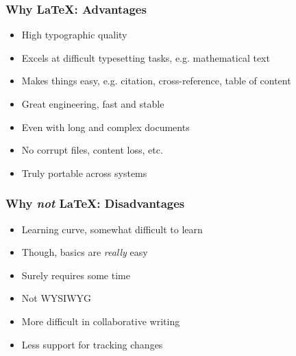 \documentclass{beamer}
\begin{document}



\begin{frame}
  \frametitle{Why \LaTeX: Advantages}
  
  \begin{itemize}
    \item High typographic quality
    \item Excels at difficult typesetting tasks, e.g. mathematical text
    \item Makes things easy, e.g. citation, cross-reference, table of content
    \item Great engineering, fast and stable
    \item Even with long and complex documents
    \item No corrupt files, content loss, etc.
    \item Truly portable across systems
  \end{itemize}
\end{frame}

\begin{frame}
  \frametitle{Why \emph{not} \LaTeX: Disadvantages}
	
  \begin{itemize}
    \item Learning curve, somewhat difficult to learn
    \item Though, basics are \emph{really} easy
    \item Surely requires some time
    \item Not WYSIWYG
    \item More difficult in collaborative writing
    \item Less support for tracking changes
  \end{itemize}
\end{frame}
\end{document}
